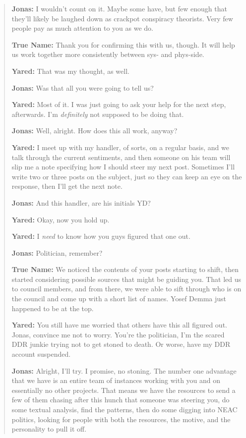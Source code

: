 \begin{quote}
\textbf{Jonas:} I wouldn't count on it. Maybe some have, but few enough that they'll likely be laughed down as crackpot conspiracy theorists. Very few people pay as much attention to you as we do.

\textbf{True Name:} Thank you for confirming this with us, though. It will help us work together more consistently between sys- and phys-side.

\textbf{Yared:} That was my thought, as well.

\textbf{Jonas:} Was that all you were going to tell us?

\textbf{Yared:} Most of it. I was just going to ask your help for the next step, afterwards. I'm \emph{definitely} not supposed to be doing that.

\textbf{Jonas:} Well, alright. How does this all work, anyway?

\textbf{Yared:} I meet up with my handler, of sorts, on a regular basis, and we talk through the current sentiments, and then someone on his team will slip me a note specifying how I should steer my next post. Sometimes I'll write two or three posts on the subject, just so they can keep an eye on the response, then I'll get the next note.

\textbf{Jonas:} And this handler, are his initials YD?

\textbf{Yared:} Okay, now you hold up.

\textbf{Yared:} I \emph{need} to know how you guys figured that one out.

\textbf{Jonas:} Politician, remember?

\textbf{True Name:} We noticed the contents of your posts starting to shift, then started considering possible sources that might be guiding you. That led us to council members, and from there, we were able to sift through who is on the council and come up with a short list of names. Yosef Demma just happened to be at the top.

\textbf{Yared:} You still have me worried that others have this all figured out. Jonas, convince me not to worry. You're the politician, I'm the scared DDR junkie trying not to get stoned to death. Or worse, have my DDR account suspended.

\textbf{Jonas:} Alright, I'll try. I promise, no stoning. The number one advantage that we have is an entire team of instances working with you and on essentially no other projects. That means we have the resources to send a few of them chasing after this hunch that someone was steering you, do some textual analysis, find the patterns, then do some digging into NEAC politics, looking for people with both the resources, the motive, and the personality to pull it off.


\end{quote}
